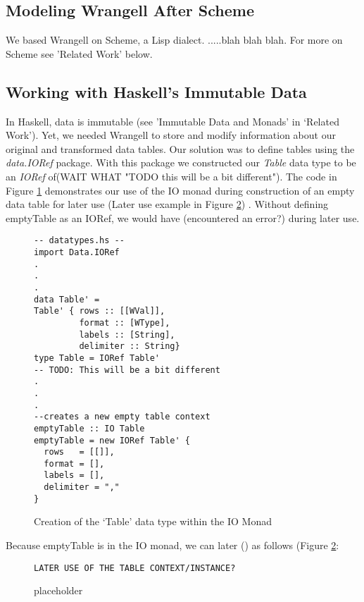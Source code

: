 \documentclass[preprint,nocopyrightspace]{sig-alternate}
\begin{document}
\subsection{Modeling Wrangell After Scheme}
We based Wrangell on Scheme, a Lisp dialect. .....blah blah blah. For more on Scheme see 'Related Work' below. 


\subsection{Working with Haskell's Immutable Data}
In Haskell, data is immutable (see 'Immutable Data and Monads' in `Related Work'). Yet, we needed Wrangell to store and modify information about our original and transformed data tables. Our solution was to define tables using the \emph{data.IORef} package. With this package we constructed our \emph{Table} data type to be an \emph{IORef} of(WAIT WHAT "TODO this will be a bit different"). The code in Figure \ref{tableIORef} demonstrates our use of the IO monad during construction of an empty data table for later use (Later use example in Figure \ref{tableIoRefLaterUse}) . 
Without defining emptyTable as an IORef, we would have (encountered an error?) during later use. 

\begin{figure}
\caption{Creation of the `Table' data type within the IO Monad}
\begin{lstlisting}
-- datatypes.hs --
import Data.IORef
.
.
.
data Table' = 
Table' { rows :: [[WVal]], 
         format :: [WType], 
         labels :: [String], 
         delimiter :: String}
type Table = IORef Table' 
-- TODO: This will be a bit different
.
.
.
--creates a new empty table context
emptyTable :: IO Table
emptyTable = new IORef Table' {    
  rows   = [[]],
  format = [],
  labels = [],
  delimiter = ","
}
\end{lstlisting}
\label{tableIORef}
\end{figure}
Because emptyTable is in the IO monad, we can later () as follows (Figure \ref{tableIoRefLaterUse}:
\begin{figure}
\caption{placeholder}
\begin{lstlisting}
LATER USE OF THE TABLE CONTEXT/INSTANCE?
\end{lstlisting}
\label{tableIoRefLaterUse}
\end{figure}
\end{document}
